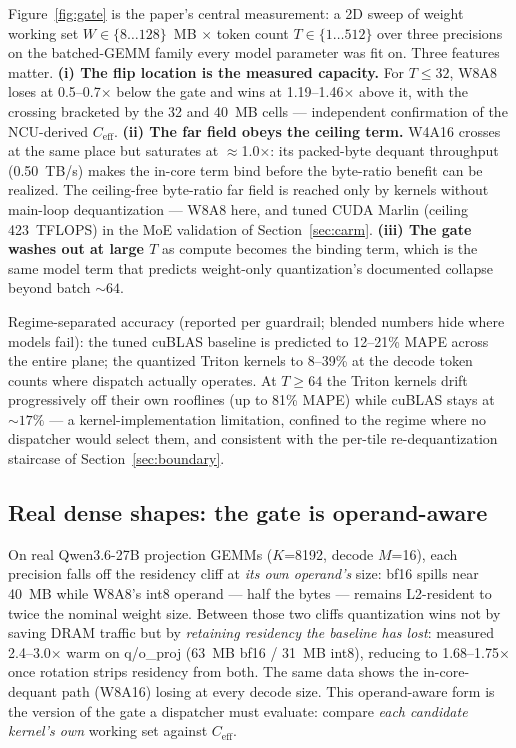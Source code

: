 \documentclass[10pt,twocolumn]{article}
\begin{document}
Figure~\ref{fig:gate} is the paper's central measurement: a 2D sweep of weight working set $W\in\{8\dots128\}$~MB $\times$ token count $T\in\{1\dots512\}$ over three precisions on the batched-GEMM family every model parameter was fit on.  Three features matter.  \textbf{(i) The flip location is the measured capacity.}  For $T\leq 32$, W8A8 loses at 0.5--0.7$\times$ below the gate and wins at 1.19--1.46$\times$ above it, with the crossing bracketed by the 32 and 40~MB cells --- independent confirmation of the NCU-derived $C_\text{eff}$.  \textbf{(ii) The far field obeys the ceiling term.}  W4A16 crosses at the same place but saturates at $\approx$1.0$\times$: its packed-byte dequant throughput (0.50~TB/s) makes the in-core term bind before the byte-ratio benefit can be realized.  The ceiling-free byte-ratio far field is reached only by kernels without main-loop dequantization --- W8A8 here, and tuned CUDA Marlin (ceiling 423~TFLOPS) in the MoE validation of Section~\ref{sec:carm}.  \textbf{(iii) The gate washes out at large $T$} as compute becomes the binding term, which is the same model term that predicts weight-only quantization's documented collapse beyond batch ${\sim}64$.

Regime-separated accuracy (reported per guardrail; blended numbers hide where models fail): the tuned cuBLAS baseline is predicted to 12--21\% MAPE across the entire plane; the quantized Triton kernels to 8--39\% at the decode token counts where dispatch actually operates.  At $T\geq 64$ the Triton kernels drift progressively off their own rooflines (up to 81\% MAPE) while cuBLAS stays at ${\sim}17\%$ --- a kernel-implementation limitation, confined to the regime where no dispatcher would select them, and consistent with the per-tile re-dequantization staircase of Section~\ref{sec:boundary}.

\subsection{Real dense shapes: the gate is operand-aware}
On real Qwen3.6-27B projection GEMMs ($K$=8192, decode $M$=16), each precision falls off the residency cliff at \emph{its own operand's} size: bf16 spills near 40~MB while W8A8's int8 operand --- half the bytes --- remains L2-resident to twice the nominal weight size.  Between those two cliffs quantization wins not by saving DRAM traffic but by \emph{retaining residency the baseline has lost}: measured 2.4--3.0$\times$ warm on q/o\_proj (63~MB bf16 / 31~MB int8), reducing to 1.68--1.75$\times$ once rotation strips residency from both.  The same data shows the in-core-dequant path (W8A16) losing at every decode size.  This operand-aware form is the version of the gate a dispatcher must evaluate: compare \emph{each candidate kernel's own} working set against $C_\text{eff}$.
\end{document}
